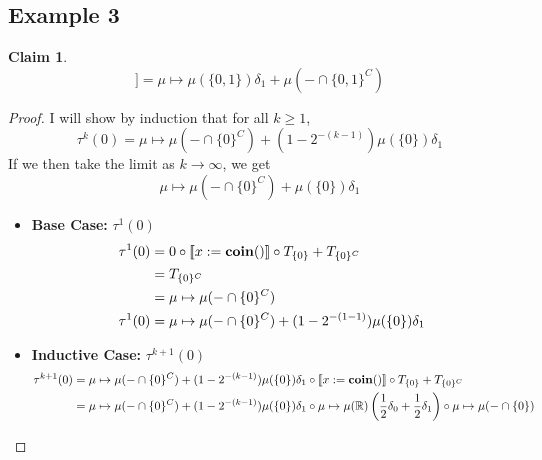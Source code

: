 \documentclass{article}
\newtheorem*{claim}{Claim}
\begin{document}
		\subsection{Example 3}
		\begin{claim}
			\begin{equation*}
				[\![\text{ \bf while } x == 0 \text{ \bf do } x := { \bf coin()}]\!] 
				= \mu \mapsto \mu(\{0, 1\})\delta_1 + \mu(- \cap \{0, 1\}^C)
			\end{equation*}
		\end{claim}
		\begin{proof}
			I will show by induction that for all $k \geq 1$,
			\begin{equation*}
				\tau^k(0) = \mu \mapsto \mu(- \cap \{0\}^C) + (1 - 2^{-(k-1)})\mu(\{0\})\delta_1
			\end{equation*}
			If we then take the limit as $k \to \infty$, we get
			\begin{equation*}
				\mu \mapsto \mu(- \cap \{0\}^C) + \mu(\{0\})\delta_1
			\end{equation*}
			\begin{itemize}
				\item {\bf Base Case:} $\tau^1(0)$ \\
					\begin{equation*}
						\begin{split}
							\tau^1(0) 
							&= 0 \circ [\![ x := { \bf coin()} ]\!] \circ T_{\{0\}} + T_{\{0\}^C} \\
							&= T_{\{0\}^C} \\
							&= \mu \mapsto \mu(- \cap \{0\}^C) \\
							\tau^1(0) &= \mu \mapsto \mu(- \cap \{0\}^C) + (1 - 2^{-(1-1)})\mu(\{0\})\delta_1
						\end{split}
					\end{equation*}
				\item {\bf Inductive Case:} $\tau^{k + 1}(0)$ \\
					\begin{equation*}
						\begin{split}
							\tau^{k+1}(0) 
							&= \mu \mapsto \mu(- \cap \{0\}^C) + (1 - 2^{-(k-1)})\mu(\{0\})\delta_1 
							\circ [\![ x := { \bf coin()} ]\!] 
							\circ T_{\{0\}} 
							+ T_{\{0\}^C} \\
							&= \mu \mapsto \mu(- \cap \{0\}^C) + (1 - 2^{-(k-1)})\mu(\{0\})\delta_1 
							\circ \mu \mapsto \mu(\mathbb{R})\left(\frac{1}{2}\delta_0 + \frac{1}{2}\delta_1\right) 
							\circ \mu \mapsto \mu(- \cap \{0\}) 

\end{split}
\end{equation*}
\end{itemize}
\end{proof}
\end{document}
